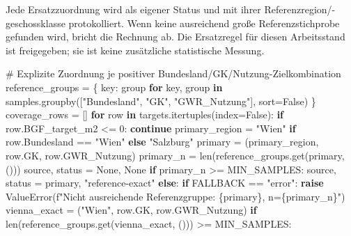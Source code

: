 \documentclass[
  ngerman,
  a4paper,
  DIV=11]{scrreprt}
\newenvironment{Shaded}{\begin{snugshade}}{\end{snugshade}}
\newcommand{\BuiltInTok}[1]{\textcolor[rgb]{0.00,0.23,0.31}{#1}}
\newcommand{\CommentTok}[1]{\textcolor[rgb]{0.37,0.37,0.37}{#1}}
\newcommand{\ControlFlowTok}[1]{\textcolor[rgb]{0.00,0.23,0.31}{\textbf{#1}}}
\newcommand{\DecValTok}[1]{\textcolor[rgb]{0.68,0.00,0.00}{#1}}
\newcommand{\KeywordTok}[1]{\textcolor[rgb]{0.00,0.23,0.31}{\textbf{#1}}}
\newcommand{\NormalTok}[1]{\textcolor[rgb]{0.00,0.23,0.31}{#1}}
\newcommand{\OperatorTok}[1]{\textcolor[rgb]{0.37,0.37,0.37}{#1}}
\newcommand{\PreprocessorTok}[1]{\textcolor[rgb]{0.68,0.00,0.00}{#1}}
\newcommand{\SpecialCharTok}[1]{\textcolor[rgb]{0.37,0.37,0.37}{#1}}
\newcommand{\SpecialStringTok}[1]{\textcolor[rgb]{0.13,0.47,0.30}{#1}}
\newcommand{\StringTok}[1]{\textcolor[rgb]{0.13,0.47,0.30}{#1}}
\newcommand{\VariableTok}[1]{\textcolor[rgb]{0.07,0.07,0.07}{#1}}
\begin{document}
Jede Ersatzzuordnung wird als eigener Status und mit ihrer
Referenzregion/-geschossklasse protokolliert. Wenn keine ausreichend
große Referenzstichprobe gefunden wird, bricht die Rechnung ab. Die
Ersatzregel für diesen Arbeitsstand ist freigegeben; sie ist keine
zusätzliche statistische Messung.

\begin{Shaded}
\begin{Highlighting}[]
\CommentTok{\# Explizite Zuordnung je positiver Bundesland/GK/Nutzung{-}Zielkombination}
\NormalTok{reference\_groups }\OperatorTok{=}\NormalTok{ \{}
\NormalTok{    key: group }\ControlFlowTok{for}\NormalTok{ key, group }\KeywordTok{in}\NormalTok{ samples.groupby([}\StringTok{"Bundesland"}\NormalTok{, }\StringTok{"GK"}\NormalTok{, }\StringTok{"GWR\_Nutzung"}\NormalTok{], sort}\OperatorTok{=}\VariableTok{False}\NormalTok{)}
\NormalTok{\}}
\NormalTok{coverage\_rows }\OperatorTok{=}\NormalTok{ []}
\ControlFlowTok{for}\NormalTok{ row }\KeywordTok{in}\NormalTok{ targets.itertuples(index}\OperatorTok{=}\VariableTok{False}\NormalTok{):}
    \ControlFlowTok{if}\NormalTok{ row.BGF\_target\_m2 }\OperatorTok{\textless{}=} \DecValTok{0}\NormalTok{:}
        \ControlFlowTok{continue}
\NormalTok{    primary\_region }\OperatorTok{=} \StringTok{"Wien"} \ControlFlowTok{if}\NormalTok{ row.Bundesland }\OperatorTok{==} \StringTok{"Wien"} \ControlFlowTok{else} \StringTok{"Salzburg"}
\NormalTok{    primary }\OperatorTok{=}\NormalTok{ (primary\_region, row.GK, row.GWR\_Nutzung)}
\NormalTok{    primary\_n }\OperatorTok{=} \BuiltInTok{len}\NormalTok{(reference\_groups.get(primary, ()))}
\NormalTok{    source, status }\OperatorTok{=} \VariableTok{None}\NormalTok{, }\VariableTok{None}
    \ControlFlowTok{if}\NormalTok{ primary\_n }\OperatorTok{\textgreater{}=}\NormalTok{ MIN\_SAMPLES:}
\NormalTok{        source, status }\OperatorTok{=}\NormalTok{ primary, }\StringTok{"reference{-}exact"}
    \ControlFlowTok{else}\NormalTok{:}
        \ControlFlowTok{if}\NormalTok{ FALLBACK }\OperatorTok{==} \StringTok{"error"}\NormalTok{:}
            \ControlFlowTok{raise} \PreprocessorTok{ValueError}\NormalTok{(}\SpecialStringTok{f"Nicht ausreichende Referenzgruppe: }\SpecialCharTok{\{}\NormalTok{primary}\SpecialCharTok{\}}\SpecialStringTok{, n=}\SpecialCharTok{\{}\NormalTok{primary\_n}\SpecialCharTok{\}}\SpecialStringTok{"}\NormalTok{)}
\NormalTok{        vienna\_exact }\OperatorTok{=}\NormalTok{ (}\StringTok{"Wien"}\NormalTok{, row.GK, row.GWR\_Nutzung)}
        \ControlFlowTok{if} \BuiltInTok{len}\NormalTok{(reference\_groups.get(vienna\_exact, ())) }\OperatorTok{\textgreater{}=}\NormalTok{ MIN\_SAMPLES:}

\end{Highlighting}
\end{Shaded}
\end{document}
